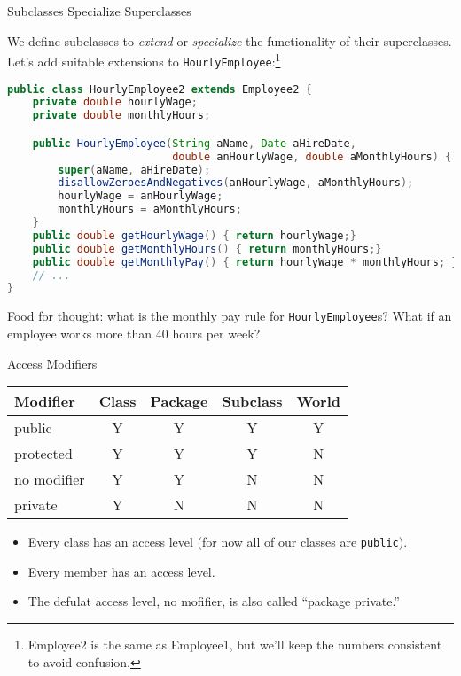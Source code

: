 \documentclass{beamer}
\begin{document}
\begin{frame}[fragile]{Subclasses Specialize Superclasses}


We define subclasses to {\it extend} or {\it specialize} the functionality of their superclasses.  Let's add suitable extensions to {\tt HourlyEmployee}:\footnote{Employee2 is the same as Employee1, but we'll keep the numbers consistent to avoid confusion.}
\vspace{-.05in}
\begin{lstlisting}[language=Java]
public class HourlyEmployee2 extends Employee2 {
    private double hourlyWage;
    private double monthlyHours;

    public HourlyEmployee(String aName, Date aHireDate,
                          double anHourlyWage, double aMonthlyHours) {
        super(aName, aHireDate);
        disallowZeroesAndNegatives(anHourlyWage, aMonthlyHours);
        hourlyWage = anHourlyWage;
        monthlyHours = aMonthlyHours;
    }
    public double getHourlyWage() { return hourlyWage;}
    public double getMonthlyHours() { return monthlyHours;}
    public double getMonthlyPay() { return hourlyWage * monthlyHours; }
    // ...
}
\end{lstlisting}
\vspace{-.1in}
Food for thought: what is the monthly pay rule for {\tt HourlyEmployee}s?  What if an employee works more than 40 hours per week?
\end{frame}

\begin{frame}[fragile]{Access Modifiers}


\begin{center}
\begin{tabular}{|l|c|c|c|c|} \hline
Modifier & Class & Package & Subclass & World\\
\hline
public & Y & Y & Y & Y\\
protected & Y & Y & Y & N\\
no modifier & Y & Y & N & N\\
private & Y & N & N & N\\
\hline
\end{tabular}
\end{center}

\begin{itemize}
\item Every class has an access level (for now all of our classes are {\tt public}).
\item Every member has an access level.
\item The defulat access level, no mofifier, is also called ``package private.''
\end{itemize}

\end{frame}
\end{document}
